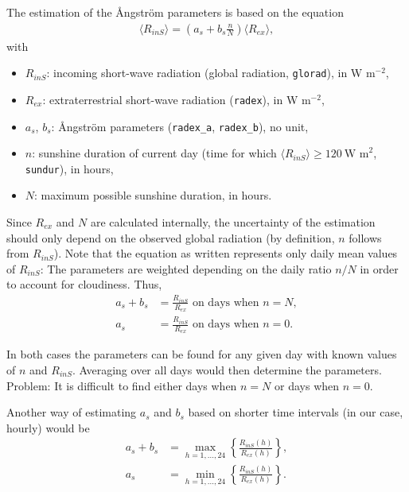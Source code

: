 \documentclass{scrreprt}
\begin{document}
The estimation of the {\AA}ngstr\"om parameters is based on the equation
\begin{align} \label{eq:R1}
  \langle R_{inS} \rangle = \left (  a_s + b_s \frac{n}{N} \right ) \langle R_{ex} \rangle,
\end{align}
%
with
\begin{itemize}
  \item[] $R_{inS}$: incoming short-wave radiation (global radiation, \verb!glorad!), in W m$^{-2}$,
  \item[] $R_{ex}$: extraterrestrial short-wave radiation (\verb!radex!), in W m$^{-2}$,
  \item[] $a_s$, $b_s$: {\AA}ngstr\"om parameters (\verb!radex_a!, \verb!radex_b!), no unit,
  \item[] $n$: sunshine duration of current day (time for which $\langle R_{inS} \rangle \geq 120~\text{W~m}^2$, \verb!sundur!), in hours,
  \item[] $N$: maximum possible sunshine duration, in hours.
\end{itemize}

Since $R_{ex}$ and $N$ are calculated internally, the uncertainty of the estimation should only depend on the observed global radiation (by definition, $n$ follows from $R_{inS}$).
Note that the equation as written represents only daily mean values of $R_{inS}$:
The parameters are weighted depending on the daily ratio $n/N$ in order to account for cloudiness.
Thus,
\begin{align}
  a_s + b_s &= \frac{R_{inS}}{R_{ex}} \text{ on days when } n=N, \label{eq:R2} \\
  a_s &= \frac{R_{inS}}{R_{ex}} \text{ on days when } n=0. \label{eq:R3}
\end{align}

In both cases the parameters can be found for any given day with known values of $n$ and $R_{inS}$.
Averaging over all days would then determine the parameters.
Problem: It is difficult to find either days when $n=N$ or days when $n=0$.

Another way of estimating $a_s$ and $b_s$ based on shorter time intervals (in our case, hourly) would be
\begin{align}
  a_s + b_s &= \max_{h = 1, ..., 24} \left \{ \frac{R_{inS} (h)}{R_{ex} (h)} \right \}, \label{eq:R4} \\
  a_s &= \min_{h = 1, ..., 24} \left \{ \frac{R_{inS} (h)}{R_{ex} (h)} \right \}. \label{eq:R5}
\end{align}
\end{document}
